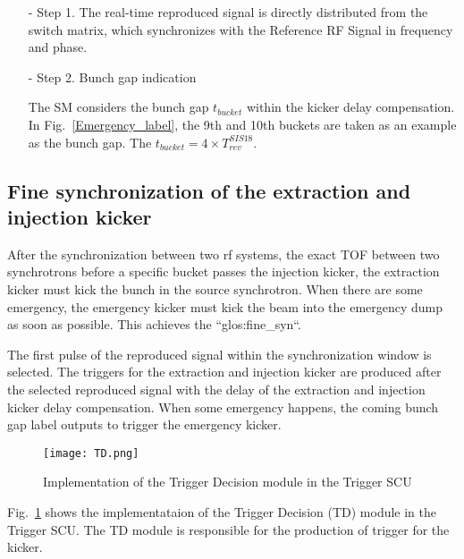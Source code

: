 \begin{itemize}
\begin{itemize}
\item[-] Step 1. The real-time reproduced signal is directly distributed from the switch matrix, which synchronizes with the Reference RF Signal in frequency and phase.
\item[-] Step 2. Bunch gap indication

The SM considers the bunch gap $t_{\mathit{bucket}}$ within the kicker delay compensation. In Fig.~\ref{Emergency_label}, the 9th and 10th buckets are taken as an example as the bunch gap. The $t_{\mathit{bucket}}=4\times T_{\mathit{rev}}^{\mathit{SIS18}}$.

\end{itemize}

\end{itemize}

\subsection{Fine synchronization of the extraction and injection kicker}
After the synchronization between two rf systems, the exact TOF between two synchrotrons before a specific bucket passes the injection kicker, the extraction kicker must kick the bunch in the source synchrotron. When there are some emergency, the emergency kicker must kick the beam into the emergency dump as soon as possible. This achieves the ``\gls{glos:fine_syn}``.

The first pulse of the reproduced signal within the synchronization window is selected. The triggers for the extraction and injection kicker are produced after the selected reproduced signal with the delay of the extraction and injection kicker delay compensation. When some emergency happens, the coming bunch gap label outputs to trigger the emergency kicker.
 \begin{figure}[!htb]
   \centering   
   \texttt{[image: TD.png]}
   \caption{Implementation of the Trigger Decision module in the Trigger SCU}
   \label{TD}
\end{figure}
Fig.~\ref{TD} shows the implementataion of the Trigger Decision (TD) module in the Trigger SCU.  The TD module is responsible for the production of trigger for the kicker. 

